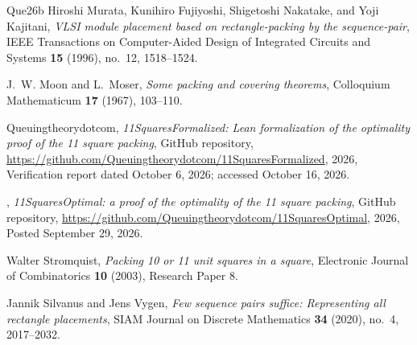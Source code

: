 \documentclass[12pt]{amsart}
\theoremstyle{definition}
\theoremstyle{remark}
\numberwithin{equation}{section}
\numberwithin{figure}{section}
\numberwithin{table}{section}
\begin{document}
\begin{thebibliography}{{Que}26b}
Hiroshi Murata, Kunihiro Fujiyoshi, Shigetoshi Nakatake, and Yoji Kajitani,
  \emph{{VLSI} module placement based on rectangle-packing by the
  sequence-pair}, IEEE Transactions on Computer-Aided Design of Integrated
  Circuits and Systems \textbf{15} (1996), no.~12, 1518--1524.

J.~W. Moon and L.~Moser, \emph{Some packing and covering theorems}, Colloquium
  Mathematicum \textbf{17} (1967), 103--110.

{Queuingtheorydotcom}, \emph{11{S}quares{F}ormalized: {L}ean formalization of
  the optimality proof of the 11 square packing}, GitHub repository,
  \url{https://github.com/Queuingtheorydotcom/11SquaresFormalized}, 2026,
  Verification report dated October 6, 2026; accessed October 16, 2026.

\bysame, \emph{11{S}quares{O}ptimal: a proof of the optimality of the 11 square
  packing}, GitHub repository,
  \url{https://github.com/Queuingtheorydotcom/11SquaresOptimal}, 2026, Posted
  September 29, 2026.

Walter Stromquist, \emph{Packing 10 or 11 unit squares in a square}, Electronic
  Journal of Combinatorics \textbf{10} (2003), Research Paper 8.

Jannik Silvanus and Jens Vygen, \emph{Few sequence pairs suffice: Representing
  all rectangle placements}, SIAM Journal on Discrete Mathematics \textbf{34}
  (2020), no.~4, 2017--2032.

\end{thebibliography}
\end{document}
